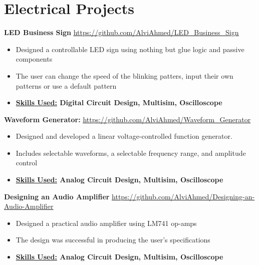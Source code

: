 

\section*{Electrical Projects}


\textbf{LED Business Sign}
\underline{\url{https://github.com/AlviAhmed/LED_Business_Sign}}
\begin{itemize}[noitemsep,nolistsep]
\item Designed a controllable LED sign using nothing but glue logic and passive components
\item The user can change the speed of the blinking patters, input their own patterns or
  use a default pattern
\item \textbf{ \underline{Skills Used:} Digital Circuit Design, Multisim, Oscilloscope}
\end{itemize}


\textbf{Waveform Generator: }
\underline{\url{https://github.com/AlviAhmed/Waveform_Generator}}
\begin{itemize}[noitemsep,nolistsep]
\item Designed and developed a linear voltage-controlled function generator. 
\item Includes selectable waveforms, a selectable frequency range, and amplitude control
\item \textbf{ \underline{Skills Used:} Analog Circuit Design, Multisim, Oscilloscope}
\end{itemize}            


\textbf{Designing an Audio Amplifier}
\underline{\url{https://github.com/AlviAhmed/Designing-an-Audio-Amplifier}}
\begin{itemize}[noitemsep,nolistsep]
\item Designed a practical audio amplifier using LM741 op-amps
\item The design was successful in producing the user's specifications
\item \textbf{ \underline{Skills Used:} Analog Circuit Design, Multisim, Oscilloscope}
\end{itemize}













